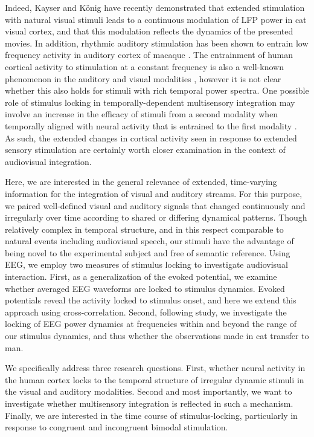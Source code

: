 Indeed, Kayser and K\"onig \citep{kayser2004b} have recently demonstrated
that extended stimulation with natural visual stimuli leads to a continuous
modulation of LFP power in cat visual cortex, and that this modulation
reflects the dynamics of the presented movies. In addition, rhythmic
auditory stimulation has been shown to entrain low frequency activity in
auditory cortex of macaque \citep{lakatos2005a}. The entrainment of human
cortical activity to stimulation at a constant frequency is also a
well-known phenomenon in the auditory \citep{galambos1981a,
bidet-caulet2007a} and visual modalities \citep[e.g.][]{regan1966a,
ding2006a}, however it is not clear whether this also holds for stimuli
with rich temporal power spectra. One possible role of stimulus locking in
temporally-dependent multisensory integration may involve an increase in
the efficacy of stimuli from a second modality when temporally aligned with
neural activity that is entrained to the first modality
\citep{lakatos2007a, kayser2008a, schroeder2008a}. As such, the extended
changes in cortical activity seen in response to extended sensory
stimulation are certainly worth closer examination in the context of
audiovisual integration.



Here, we are interested in the general relevance of extended, time-varying
information for the integration of visual and auditory streams. For this
purpose, we paired well-defined visual and auditory signals that changed
continuously and irregularly over time according to shared or differing
dynamical patterns. Though relatively complex in temporal structure, and in
this respect comparable to natural events including audiovisual speech, our
stimuli have the advantage of being novel to the experimental subject and
free of semantic reference. Using EEG, we employ two measures of stimulus
locking to investigate audiovisual interaction. First, as a generalization
of the evoked potential, we examine whether averaged EEG waveforms are
locked to stimulus dynamics. Evoked potentials reveal the activity locked
to stimulus onset, and here we extend this approach using
cross-correlation. Second, following \cite{kayser2004b} study, we
investigate the locking of EEG power dynamics at frequencies within and
beyond the range of our stimulus dynamics, and thus whether the
observations made in cat transfer to man. 



We specifically address three research questions. First, whether neural
activity in the human cortex locks to the temporal structure of irregular
dynamic stimuli in the visual and auditory modalities. Second and most
importantly, we want to investigate whether multisensory integration is
reflected in such a mechanism. Finally, we are interested in the time
course of stimulus-locking, particularly in response to congruent and
incongruent bimodal stimulation.


